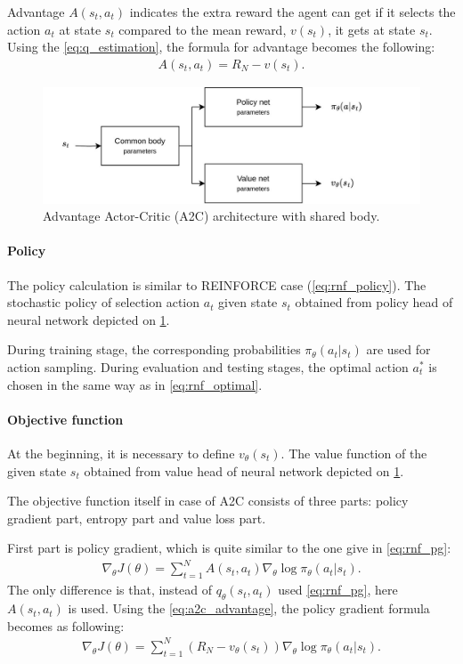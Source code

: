 \documentclass{article}
\begin{document}
Advantage $A(s_t, a_t)$ indicates the extra reward the agent can get if it
selects the action $a_t$ at state $s_t$ compared to the mean reward, $v(s_t)$,
it gets at state $s_t$. Using the \cref{eq:q_estimation}, the formula for
advantage becomes the following:
\begin{align}
  \label{eq:a2c_advantage}
  A(s_t, a_t) = R_N - v(s_t).
\end{align}

\begin{figure}[hbt]
  \centering
  \includegraphics[width=\textwidth,keepaspectratio]{pictures/a2c.jpg}
  \caption[Advantage Actor-Critic (A2C) architecture with shared body]
  {Advantage Actor-Critic (A2C) architecture with shared body.
  }\label{fig:a2c_arch}
\end{figure}

\paragraph{Policy}
The policy calculation is similar to REINFORCE case (\cref{eq:rnf_policy}). The
stochastic policy of selection action $a_t$ given state $s_t$ obtained from
policy head of neural network depicted on \cref{fig:a2c_arch}.

During training stage, the corresponding probabilities $\pi_{\theta}(a_t | s_t)$
are used for action sampling. During evaluation and
testing stages, the optimal action $a_t^\ast$ is chosen in the same way as in
\cref{eq:rnf_optimal}.

\paragraph{Objective function}
At the beginning, it is necessary to define $v_\theta(s_t)$. The value function
of the given state $s_t$ obtained from value head of neural network depicted on \cref{fig:a2c_arch}.

The objective function itself in case of A2C consists of three parts: policy
gradient part, entropy part and value loss part.

First part is policy gradient, which is quite similar to the one give in
\cref{eq:rnf_pg}:
\begin{align*}
  \nabla_{\theta} J(\theta) =
  \sum_{t=1}^N A(s_t, a_t)\nabla_{\theta}  \log \pi_{\theta}(a_t | s_t).
\end{align*}
The only difference is that, instead of $q_\theta(s_t, a_t)$ used
\cref{eq:rnf_pg},
here $A(s_t, a_t)$ is used. Using the \cref{eq:a2c_advantage},
the policy gradient formula becomes as following:
\begin{align}
  \label{eq:a2c_pg}
  \nabla_{\theta} J(\theta) =
  \sum_{t=1}^N (R_N - v_\theta(s_t)) \nabla_{\theta} \log \pi_{\theta}(a_t | s_t).
\end{align}
\end{document}
